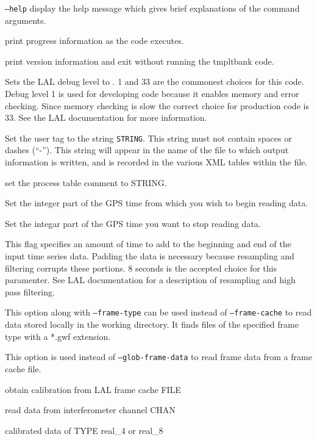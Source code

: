 \begin{entry}
\item[\texttt{--help}] display the help message which gives brief explanations
of the command arguments.  
\item[\option{--verbose}] print progress information as the code executes.
\item[\option{--version}] print version information and exit without running 
the tmpltbank code. 
\item[\option{--debug-level LEVEL}] Sets the LAL debug level to .  
1 and 33 are the commonest choices for this code.  Debug level 1 is used for 
developing code because it enables memory and error checking.  Since memory 
checking is slow the correct choice for production code is 33.  
See the LAL documentation for more information.  
\item[\option{--user-tag STRING}] Set the user tag to the string \texttt{STRING}.  
This string must not contain spaces or dashes (``-'').  This string will appear 
in the name of the file to which output information is written, and is recorded 
in the various XML tables within the file.
\item[\option{--comment STRING}] set the process table comment to STRING.
\item[\option{--gps-start-time SEC}] Set the integer part of the GPS time from 
which you wish to begin reading data.
\item[\option{--gps-end-time SEC}] Set the integar part of the GPS time you want
to stop reading data. 
\item[\option{--pad-data T}] This flag specifies an amount of time to add to 
the beginning and end of the input time series data.  Padding the data is 
necessary because resampling and filtering corrupts these portions. 
8 seconds is the accepted choice for this paramenter.  See LAL documentation 
for a description of resampling and high pass filtering.  
\item[\option{--glob-frame-data}] This option along with \texttt{--frame-type}
can be used instead of \texttt{--frame-cache} to read data stored locally in 
the working directory.  It finds files of the specified frame type with a *.gwf 
extension. 
\item[\option{--frame-cache}] This option is used instead of 
\texttt{--glob-frame-data} to read frame data from a frame cache file. 
\item[\option{--calibration-cache FILE}] obtain calibration from LAL frame 
cache FILE
\item[\option{--channel-name CHAN}] read data from interferometer channel CHAN
\item[\option{--calibrated-data TYPE}] calibrated data of TYPE real\_4 or real\_8


\end{entry}
